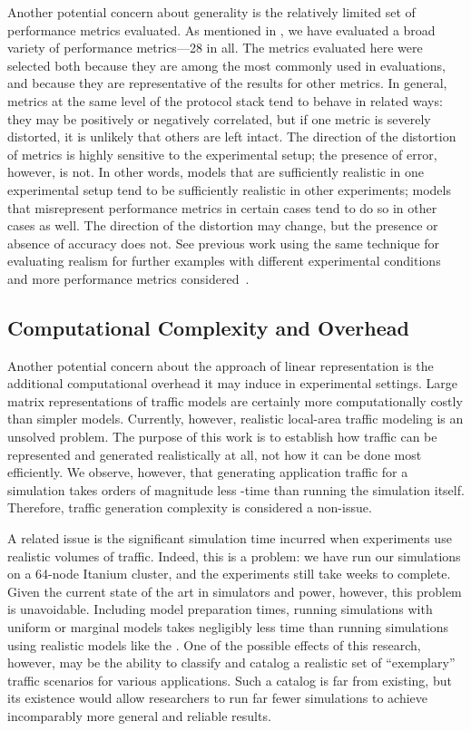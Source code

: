 \documentclass[twocolumn,final]{svjour3}
\begin{document}
Another potential concern about generality is the relatively limited set of performance metrics evaluated.
As mentioned in , we have evaluated a broad variety of performance metrics---28 in all.
The metrics evaluated here were selected both because they are among the most commonly used in evaluations, and because they are representative of the results for other metrics.
In general, metrics at the same level of the protocol stack tend to behave in related ways:
they may be positively or negatively correlated, but if one metric is severely distorted, it is unlikely that others are left intact.
The direction of the distortion of metrics is highly sensitive to the experimental setup;
the presence of error, however, is not.
In other words, models that are sufficiently realistic in one experimental setup tend to be sufficiently realistic in other experiments;
models that misrepresent performance metrics in certain cases tend to do so in other cases as well.
The direction of the distortion may change, but the presence or absence of accuracy does not.
See previous work using the same technique for evaluating realism for further examples with different experimental conditions and more performance metrics considered~\cite{Karpinski07:realism,Karpinski07:cbr-failure}.

\subsection{Computational Complexity and Overhead}

Another potential concern about the approach of linear representation is the additional computational overhead it may induce in experimental settings.
Large matrix representations of traffic models are certainly more computationally costly than simpler models.
Currently, however, realistic local-area traffic modeling is an unsolved problem.
The purpose of this work is to establish how traffic can be represented and generated realistically at all, not how it can be done most efficiently.
We observe, however, that generating application traffic for a simulation takes orders of magnitude less -time than running the simulation itself.
Therefore, traffic generation complexity is considered a non-issue.

A related issue is the significant simulation time incurred when experiments use realistic volumes of traffic.
Indeed, this is a problem:
we have run our simulations on a 64-node Itanium cluster, and the experiments still take weeks to complete.
Given the current state of the art in simulators and  power, however, this problem is unavoidable.
Including model preparation times, running simulations with uniform or marginal models takes negligibly less time than running simulations using realistic models like the .
One of the possible effects of this research, however, may be the ability to classify and catalog a realistic set of ``exemplary'' traffic scenarios for various applications.
Such a catalog is far from existing, but its existence would allow researchers to run far fewer simulations to achieve incomparably more general and reliable results.
\end{document}
